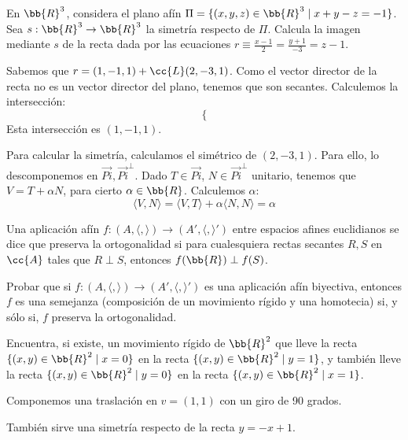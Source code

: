 \begin{ejercicio}
    En $\bb{R}^3$, considera el plano afín $\Pi = \{(x, y, z) \in \bb{R}^3 \mid x + y - z = -1\}$. Sea $s : \bb{R}^3 \to \bb{R}^3$ la simetría respecto de $\Pi$. Calcula la imagen mediante $s$ de la recta dada por las ecuaciones $r\equiv \frac{x-1}{2} =\frac{y+1}{-3} = z - 1$.

    Sabemos que $r=(1,-1,1)+\cc{L}(2, -3, 1)$. Como el vector director de la recta no es un vector director del plano, tenemos que son secantes. Calculemos la intersección:
    \begin{equation*}
        \left\{\right.
    \end{equation*}
    Esta intersección es $(1, -1, 1)$.

    Para calcular la simetría, calculamos el simétrico de $(2,-3,1)$. Para ello, lo descomponemos en $\vec{Pi}, \vec{Pi}^\perp$. Dado $T\in \vec{Pi}$, $N\in \vec{Pi}^\perp$ unitario, tenemos que $V=T+\alpha N$, para cierto $\alpha\in \bb{R}$. Calculemos $\alpha$:
    \begin{equation*}
        \langle V,N\rangle = \langle V,T\rangle + \alpha \langle N,N\rangle = \alpha
    \end{equation*}
\end{ejercicio}

\begin{ejercicio}
     Una aplicación afín $f : (A, \langle , \rangle) \to (A', \langle , \rangle')$ entre espacios afines euclidianos se dice que preserva la ortogonalidad si para cualesquiera rectas secantes $R, S$ en $\cc{A}$ tales que $R \perp S$, entonces $f(\bb{R}) \perp f(S)$.

     Probar que si $f : (A, \langle , \rangle) \to (A', \langle , \rangle')$ es una aplicación afín biyectiva, entonces $f$ es una semejanza (composición de un movimiento rígido y una homotecia) si, y sólo si, $f$ preserva la ortogonalidad.
\end{ejercicio}

\begin{ejercicio}
    Encuentra, si existe, un movimiento rígido de $\bb{R}^2$ que lleve la recta $\{(x, y) \in \bb{R}^2 \mid x = 0\}$ en la recta $\{(x, y) \in \bb{R}^2 \mid y = 1\}$, y también lleve la recta $\{(x, y) \in \bb{R}^2 \mid y =0\}$ en la recta $\{(x, y) \in \bb{R}^2 \mid x = 1\}$.

    Componemos una traslación en $v=(1,1)$ con un giro de 90 grados.

    También sirve una simetría respecto de la recta $y=-x+1$.
\end{ejercicio}

